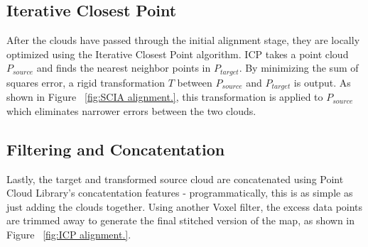 \documentclass[letterpaper, oneside, 10pt]{report}
\begin{document}
    \subsection{Iterative Closest Point}

    \noindent After the clouds have passed through the initial alignment stage, they are locally optimized using the Iterative Closest Point algorithm. ICP takes a point cloud $P_{source}$ and finds the nearest neighbor points in $P_{target}$. By minimizing the sum of squares error, a rigid transformation $T$ between $P_{source}$ and $P_{target}$ is output. As shown in Figure ~\ref{fig:SCIA alignment.}, this transformation is applied to $P_{source}$ which eliminates narrower errors between the two clouds.

    \subsection{Filtering and Concatentation}

    Lastly, the target and transformed source cloud are concatenated using Point Cloud Library's concatentation features - programmatically, this is as simple as just adding the clouds together. Using another Voxel filter, the excess data points are trimmed away to generate the final stitched version of the map, as shown in Figure ~\ref{fig:ICP alignment.}. \\
\end{document}
